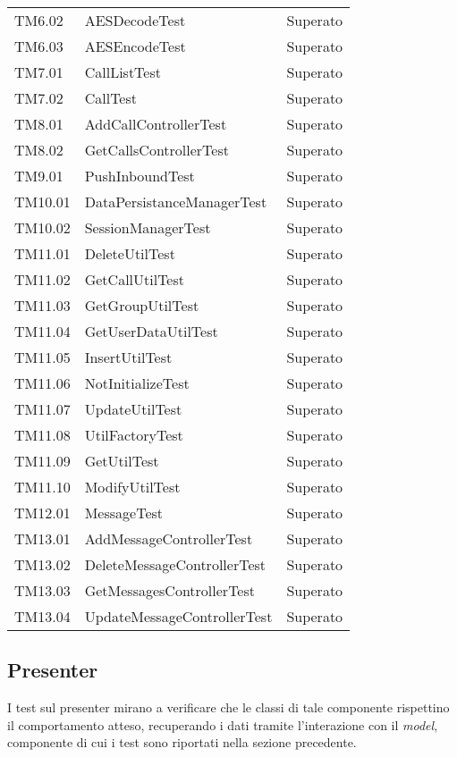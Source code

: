 \begin{center}
\begin{longtable}{p{}ll}
TM6.02 & AESDecodeTest &Superato\\
TM6.03 & AESEncodeTest &Superato\\
TM7.01 & CallListTest &Superato\\
TM7.02 & CallTest &Superato\\
TM8.01 & AddCallControllerTest &Superato\\
TM8.02 & GetCallsControllerTest &Superato\\
TM9.01 & PushInboundTest &Superato\\
TM10.01 & DataPersistanceManagerTest &Superato\\
TM10.02 & SessionManagerTest &Superato\\
TM11.01 & DeleteUtilTest &Superato\\
TM11.02 & GetCallUtilTest &Superato\\
TM11.03 & GetGroupUtilTest &Superato\\
TM11.04 & GetUserDataUtilTest &Superato\\
TM11.05 & InsertUtilTest &Superato\\
TM11.06 & NotInitializeTest &Superato\\
TM11.07 & UpdateUtilTest &Superato\\
TM11.08 & UtilFactoryTest &Superato\\
TM11.09 & GetUtilTest &Superato\\
TM11.10 & ModifyUtilTest & Superato\\
TM12.01 & MessageTest &Superato\\
TM13.01 & AddMessageControllerTest &Superato\\
TM13.02 & DeleteMessageControllerTest &Superato\\
TM13.03 & GetMessagesControllerTest &Superato\\
TM13.04 & UpdateMessageControllerTest &Superato\\
\bottomrule
\end{longtable}
\end{center}


\subsection{Presenter}
I test sul presenter mirano a verificare che le classi di tale componente rispettino il comportamento atteso, recuperando i dati tramite l'interazione con il \textit{model}, componente di cui i test sono riportati nella sezione precedente.

